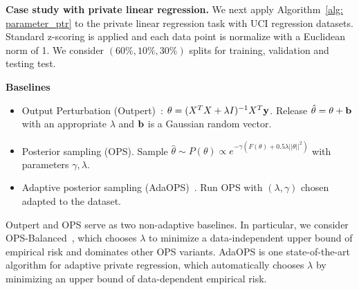 
\textbf{Case study with private linear regression.}
We next apply Algorithm~\ref{alg: parameter_ptr} to the private linear regression task with UCI regression datasets. Standard z-scoring is applied and each data point is normalize with a Euclidean norm of 1.  We consider $(60\%,10\%,30\%)$ splits for training, validation and testing test.

\textbf{Baselines}
\begin{itemize}
\vspace{-2mm}
    \item Output Perturbation (Outpert)~\citep{chaudhuri2011differentially}: $\theta=(X^TX + \lambda I)^{-1}X^T\bf{y}$. Release $\hat{\theta} = \theta + \bf{b}$ with an appropriate $\lambda$ and $\bf{b}$ is a Gaussian random vector.\vspace{-2mm}
    \item Posterior sampling (OPS). Sample $\hat{\theta}\sim P(\theta)\propto e^{-\gamma(F(\theta)+ 0.5 \lambda ||\theta||^2)}$ with parameters $\gamma, \lambda$.\vspace{-1.5mm}
    \item Adaptive posterior sampling (AdaOPS)~\citep{wang2018revisiting}. Run OPS with $(\lambda, \gamma)$ chosen adapted to the dataset.\vspace{-1.5mm}
\end{itemize}
Outpert and OPS serve as two non-adaptive baselines. In particular, we consider OPS-Balanced~\citep{wang2018revisiting}, which chooses $\lambda$ to minimize a data-independent upper bound of empirical risk and dominates other OPS variants. 
AdaOPS is one state-of-the-art algorithm for adaptive private regression, which  automatically chooses $\lambda$ by minimizing an upper bound of data-dependent empirical risk.


